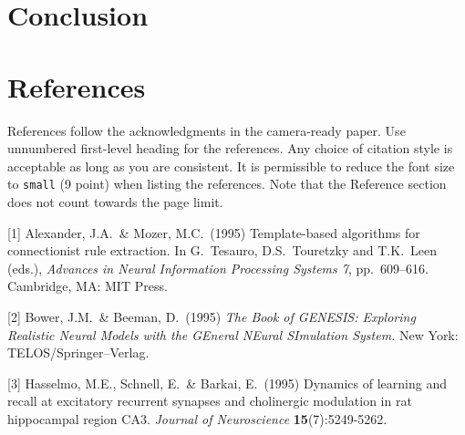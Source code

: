 \documentclass{article}
\begin{document}
\section{Conclusion}
\section*{References}


References follow the acknowledgments in the camera-ready paper. Use unnumbered first-level heading for
the references. Any choice of citation style is acceptable as long as you are
consistent. It is permissible to reduce the font size to \verb+small+ (9 point)
when listing the references.
Note that the Reference section does not count towards the page limit.
\medskip


{
\small


[1] Alexander, J.A.\ \& Mozer, M.C.\ (1995) Template-based algorithms for
connectionist rule extraction. In G.\ Tesauro, D.S.\ Touretzky and T.K.\ Leen
(eds.), {\it Advances in Neural Information Processing Systems 7},
pp.\ 609--616. Cambridge, MA: MIT Press.


[2] Bower, J.M.\ \& Beeman, D.\ (1995) {\it The Book of GENESIS: Exploring
  Realistic Neural Models with the GEneral NEural SImulation System.}  New York:
TELOS/Springer--Verlag.


[3] Hasselmo, M.E., Schnell, E.\ \& Barkai, E.\ (1995) Dynamics of learning and
recall at excitatory recurrent synapses and cholinergic modulation in rat
hippocampal region CA3. {\it Journal of Neuroscience} {\bf 15}(7):5249-5262.
}

\end{document}
